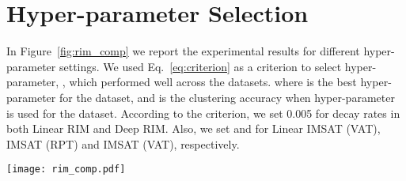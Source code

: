 \documentclass{article}
\theoremstyle{plain}
\begin{document}
\section{Hyper-parameter Selection} \label{app:hyper}
In Figure~\ref{fig:rim_comp} we report the experimental results for different hyper-parameter settings. 
We used Eq.~\eqref{eq:criterion} as a criterion to select hyper-parameter, , which performed well across the datasets. 
where  is the best hyper-parameter for the dataset, and  is the clustering accuracy when hyper-parameter  is used for the dataset. 
According to the criterion, we set 0.005 for decay rates in both Linear RIM and Deep RIM. Also, we set  and  for Linear IMSAT (VAT), IMSAT (RPT) and IMSAT (VAT), respectively.
\begin{figure*}[t]
\begin{center}
\centerline{\texttt{[image: rim\_comp.pdf]}}
\vspace{-0.3cm}
\caption{Relationship between hyper-parameters and clustering accuracy for 8 benchmark datasets with different methods: (a) Linear RIM, (b) Deep RIM, (c) Linear IMSAT (VAT), (d) IMSAT (RPT), and (e) IMSAT (VAT).}\label{fig:rim_comp}
\end{center}
\vspace{-0.8cm}
\end{figure*} 
\end{document}
